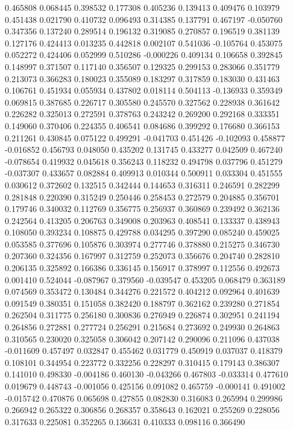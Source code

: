 0.465808
0.068445
0.398532
0.177308
0.405236
0.139413
0.409476
0.103979
0.451438
0.021790
0.410732
0.096493
0.314385
0.137791
0.467197
-0.050760
0.347356
0.137240
0.289514
0.196132
0.319085
0.270857
0.196519
0.381139
0.127176
0.424413
0.013235
0.442818
0.002107
0.541036
-0.105764
0.453075
0.052272
0.424406
0.052999
0.510286
-0.000226
0.409134
0.106658
0.392845
0.148997
0.371507
0.117140
0.356507
0.129325
0.299153
0.283066
0.351779
0.213073
0.366283
0.180023
0.355089
0.183297
0.317859
0.183030
0.431463
0.106761
0.451934
0.055934
0.437802
0.018114
0.504113
-0.136933
0.359349
0.069815
0.387685
0.226717
0.305580
0.245570
0.327562
0.228938
0.361642
0.226282
0.325013
0.272591
0.378763
0.243242
0.269200
0.292168
0.333351
0.149060
0.370406
0.224355
0.406541
0.084686
0.399292
0.176680
0.366153
0.211261
0.430845
0.075122
0.499291
-0.041703
0.451426
-0.102093
0.458877
-0.016852
0.456793
0.048050
0.435202
0.131745
0.433277
0.042509
0.467240
-0.078654
0.419932
0.045618
0.356243
0.118232
0.494798
0.037796
0.451279
-0.037307
0.433657
0.082884
0.409913
0.010344
0.500911
0.033304
0.451555
0.030612
0.372602
0.132515
0.342444
0.144653
0.316311
0.246591
0.282299
0.281848
0.220390
0.315249
0.250446
0.258453
0.272579
0.204885
0.356701
0.179746
0.340032
0.112769
0.356775
0.256937
0.360869
0.239492
0.362136
0.242564
0.413205
0.206763
0.349008
0.203963
0.408541
0.133337
0.438943
0.108050
0.393234
0.108875
0.429788
0.034295
0.397290
0.085240
0.459025
0.053585
0.377696
0.105876
0.303974
0.277746
0.378880
0.215275
0.346730
0.207360
0.324356
0.167997
0.312759
0.252073
0.356676
0.204740
0.282810
0.206135
0.325892
0.166386
0.336145
0.156917
0.378997
0.112556
0.492673
0.001410
0.524044
-0.087967
0.379560
-0.039547
0.453205
0.068479
0.363189
0.074569
0.353472
0.130484
0.344276
0.221572
0.404212
0.092964
0.401639
0.091549
0.380351
0.151058
0.382420
0.188797
0.362162
0.239280
0.271854
0.262504
0.311775
0.256180
0.300836
0.276949
0.226874
0.302951
0.241194
0.264856
0.272881
0.277724
0.256291
0.215684
0.273692
0.249930
0.264863
0.310565
0.230020
0.325058
0.306042
0.207142
0.290096
0.211096
0.437038
-0.011609
0.457497
0.032847
0.455462
0.031779
0.450919
0.037037
0.418379
0.108101
0.344954
0.223772
0.332256
0.228297
0.310415
0.179143
0.386307
0.141010
0.498330
-0.004186
0.460130
-0.043266
0.467803
-0.033314
0.477610
0.019679
0.448743
-0.001056
0.425156
0.091082
0.465759
-0.000141
0.491002
-0.015742
0.470876
0.065698
0.427855
0.082830
0.316083
0.265994
0.299986
0.266942
0.265322
0.306856
0.268357
0.358643
0.162021
0.255269
0.228056
0.317633
0.225081
0.352265
0.136631
0.410333
0.098116
0.366490
